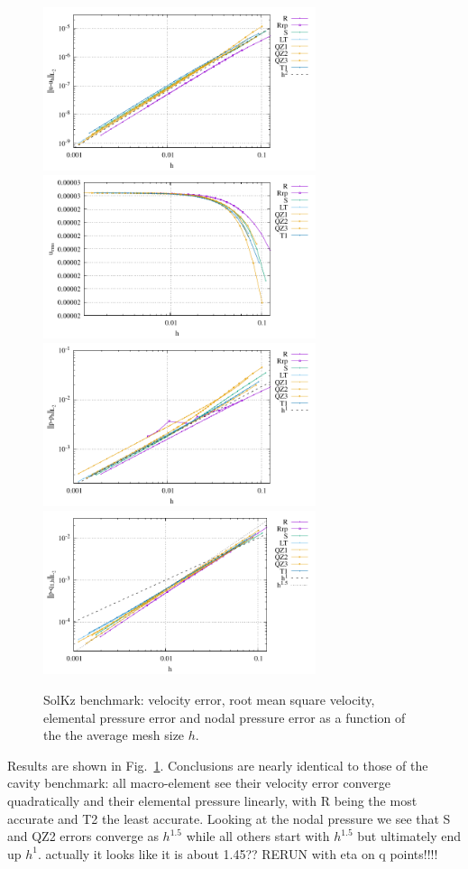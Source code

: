 \documentclass[a4paper,12pt]{article}
\begin{document}
\begin{figure}
\centering
\includegraphics[width=8cm]{../results/errors_u_exp5}
\includegraphics[width=8cm]{../results/vrms_exp5} \\
\includegraphics[width=8cm]{../results/errors_p_exp5}
\includegraphics[width=8cm]{../results/errors_q1_exp5}
\caption{SolKz benchmark: velocity error, 
root mean square velocity, elemental pressure error and nodal pressure error
as a function of the the average mesh size $h$.} 
\label{fig:ressolkz}
\end{figure}

Results are shown in Fig.~\ref{fig:ressolkz}.
Conclusions are nearly identical to those of the cavity benchmark:
all macro-element see their velocity error converge quadratically 
and their elemental pressure linearly, with R being the most accurate and
T2 the least accurate.
Looking at the nodal pressure we see that S and QZ2 errors converge as $h^{1.5}$
while all others start with $h^{1.5}$ but ultimately end up $h^1$. 
{\color{red} actually it looks like it is about 1.45??
RERUN with eta on q points!!!!}
\end{document}
